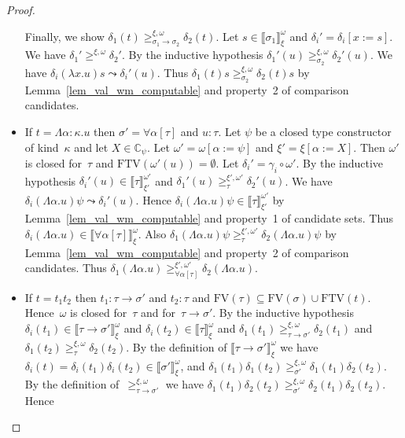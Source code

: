 \documentclass[runningheads,a4paper]{llncs}
\newcommand{\arrtype}{\rightarrow}
\newcommand{\abs}[2]{\lambda #1.#2}
\newcommand{\tabs}[2]{\Lambda #1.#2}
\newcommand{\subst}[2]{#1:=#2}
\newcommand{\FTV}{\mathrm{FTV}}
\newcommand{\FV}{\mathrm{FV}}
\newcommand{\Cb}{\mathbb{C}}
\newcommand{\val}[3]{\ensuremath{\llbracket#1\rrbracket_{#2}^{#3}}}
\newcommand{\gteq}[3]{\ensuremath{\ge_{#1}^{#2,#3}}}
\begin{document}
\begin{proof}
\begin{itemize}
    Finally, we show $\delta_1(t)
    \gteq{\sigma_1\arrtype\sigma_2}{\xi}{\omega} \delta_2(t)$. Let $s
    \in \val{\sigma_1}{\xi}{\omega}$ and
    $\delta_i'=\delta_i[\subst{x}{s}]$. We have $\delta_1'
    \gteq{}{\xi}{\omega} \delta_2'$. By the inductive hypothesis
    $\delta_1'(u) \gteq{\sigma_2}{\xi}{\omega} \delta_2'(u)$. We have
    $\delta_i(\abs{x}{u}) s \leadsto \delta_i'(u)$. Thus $\delta_1(t)
    s \gteq{\sigma_2}{\xi}{\omega} \delta_2(t) s$ by
    Lemma~\ref{lem_val_wm_computable} and property~2 of comparison
    candidates.
  \item If $t = \tabs{\alpha:\kappa}{u}$ then $\sigma' =
    \forall\alpha[\tau]$ and $u : \tau$. Let $\psi$ be a closed type
    constructor of kind~$\kappa$ and let $X \in \Cb_\psi$. Let
    $\omega' = \omega[\subst{\alpha}{\psi}]$ and
    $\xi'=\xi[\subst{\alpha}{X}]$. Then $\omega'$ is closed for~$\tau$
    and $\FTV(\omega'(u)) = \emptyset$. Let
    $\delta_i'=\gamma_i\circ\omega'$. By the inductive hypothesis
    $\delta_i'(u) \in \val{\tau}{\xi'}{\omega'}$ and $\delta_1'(u)
    \gteq{\tau}{\xi'}{\omega'} \delta_2'(u)$. We have
    $\delta_i(\tabs{\alpha}{u}) \psi \leadsto \delta_i'(u)$. Hence
    $\delta_i(\tabs{\alpha}{u}) \psi \in \val{\tau}{\xi'}{\omega'}$ by
    Lemma~\ref{lem_val_wm_computable} and property~1 of candidate
    sets. Thus $\delta_i(\tabs{\alpha}{u}) \in
    \val{\forall\alpha[\tau]}{\xi}{\omega}$. Also
    $\delta_1(\tabs{\alpha}{u}) \psi \gteq{\tau}{\xi'}{\omega'}
    \delta_2(\tabs{\alpha}{u}) \psi$ by
    Lemma~\ref{lem_val_wm_computable} and property~2 of comparison
    candidates. Thus $\delta_1(\tabs{\alpha}{u})
    \gteq{\forall\alpha[\tau]}{\xi'}{\omega'}
    \delta_2(\tabs{\alpha}{u})$.
  \item If $t = t_1 t_2$ then $t_1 : \tau\arrtype\sigma'$ and $t_2 :
    \tau$ and $\FV(\tau) \subseteq \FV(\sigma) \cup
    \FTV(t)$. Hence~$\omega$ is closed for~$\tau$ and
    for~$\tau\arrtype\sigma'$. By the inductive hypothesis
    $\delta_i(t_1) \in \val{\tau\arrtype\sigma'}{\xi}{\omega}$ and
    $\delta_i(t_2) \in \val{\tau}{\xi}{\omega}$ and $\delta_1(t_1)
    \gteq{\tau\arrtype\sigma'}{\xi}{\omega} \delta_2(t_1)$ and
    $\delta_1(t_2) \gteq{\tau}{\xi}{\omega} \delta_2(t_2)$. By the
    definition of $\val{\tau\arrtype\sigma'}{\xi}{\omega}$ we have
    $\delta_i(t) = \delta_i(t_1)\delta_i(t_2) \in
    \val{\sigma'}{\xi}{\omega}$, and $\delta_1(t_1)\delta_1(t_2)
    \gteq{\sigma'}{\xi}{\omega} \delta_1(t_1)\delta_2(t_2)$. By the
    definition of~$\gteq{\tau\arrtype\sigma'}{\xi}{\omega}$ we have
    $\delta_1(t_1)\delta_2(t_2)\gteq{\sigma'}{\xi}{\omega}\delta_2(t_1)\delta_2(t_2)$. Hence

\end{itemize}
\end{proof}
\end{document}
